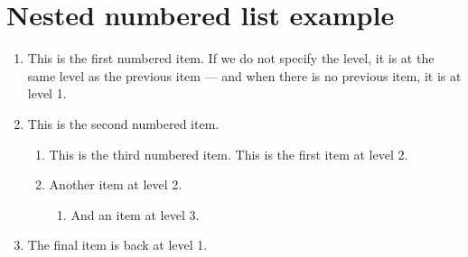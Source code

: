 \documentclass[a4paper]{report}
\begin{document}
\chapter{Nested numbered list example}
\begin{enumerate}
\item This is the first numbered item. If we do not specify the level, it is at the same level as the previous item --- and when there is no previous item, it is at level 1.
\item This is the second numbered item.
\begin{enumerate}
\item This is the third numbered item. This is the first item at level 2.
\item Another item at level 2.
\begin{enumerate}
\item And an item at level 3.
\end{enumerate}
\end{enumerate}
\item The final item is back at level 1.
\end{enumerate}
\end{document}
